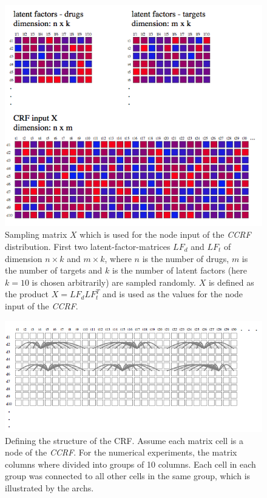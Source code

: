 \begin{figure}
\begin{center}
\includegraphics[scale=0.6]{numeric_X.png}
\end{center}
\caption[Sampling CCRF input]{\large{Sampling matrix $X$ which is used for the node input of the \textit{CCRF} distribution. First two latent-factor-matrices $LF_d$ and $LF_t$ of dimension $n \times k$ and $m \times k$, where $n$ is the number of drugs, $m$ is the number of targets and $k$ is the number of latent factors (here $k=10$ is chosen arbitrarily) are sampled randomly. $X$ is defined as the product $X=LF_d LF_t^T$ and is used as the values for the node input of the \textit{CCRF}.}}
\label{fig:numX}
\end{figure}

\begin{figure}
\begin{center}
\includegraphics[scale=0.6]{numeric_structure.png}
\end{center}
\caption[Defining the structure of the CRF]{\large{Defining the structure of the CRF. Assume each matrix cell is a node of the \textit{CCRF}. For the numerical experiments, the matrix columns where divided into groups of 10 columns. Each cell in each group was connected to all other cells in the same group, which is illustrated by the archs.}}
\label{fig:numStructure}
\end{figure}


